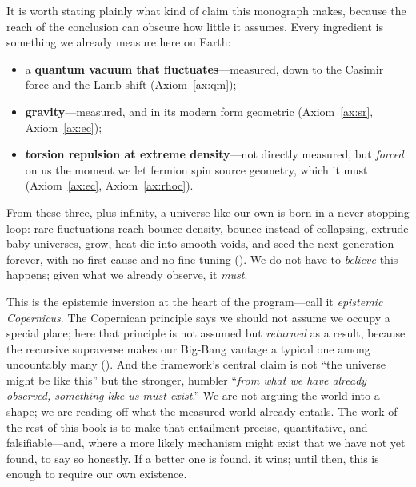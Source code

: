 It is worth stating plainly what kind of claim this monograph makes, because the
reach of the conclusion can obscure how little it assumes. Every ingredient is
something we already measure here on Earth:
\begin{itemize}
  \item a \textbf{quantum vacuum that fluctuates}---measured, down to the Casimir
    force and the Lamb shift (Axiom~\ref{ax:qm});
  \item \textbf{gravity}---measured, and in its modern form geometric
    (Axiom~\ref{ax:sr}, Axiom~\ref{ax:ec});
  \item \textbf{torsion repulsion at extreme density}---not directly measured, but
    \emph{forced} on us the moment we let fermion spin source geometry, which it must
    (Axiom~\ref{ax:ec}, Axiom~\ref{ax:rhoc}).
\end{itemize}
From these three, plus infinity, a universe like our own is born in a never-stopping
loop: rare fluctuations reach bounce density, bounce instead of collapsing, extrude
baby universes, grow, heat-die into smooth voids, and seed the next generation---
forever, with no first cause and no fine-tuning (). We do not
have to \emph{believe} this happens; given what we already observe, it \emph{must}.

This is the epistemic inversion at the heart of the program---call it
\emph{epistemic Copernicus}. The Copernican principle says we should not assume we
occupy a special place; here that principle is not assumed but \emph{returned} as a
result, because the recursive supraverse makes our Big-Bang vantage a typical one
among uncountably many (). And the framework's central claim is
not ``the universe might be like this'' but the stronger, humbler ``\emph{from what
we have already observed, something like us must exist}.'' We are not arguing the
world into a shape; we are reading off what the measured world already entails. The
work of the rest of this book is to make that entailment precise, quantitative, and
falsifiable---and, where a more likely mechanism might exist that we have not yet
found, to say so honestly. If a better one is found, it wins; until then, this is
enough to require our own existence.
